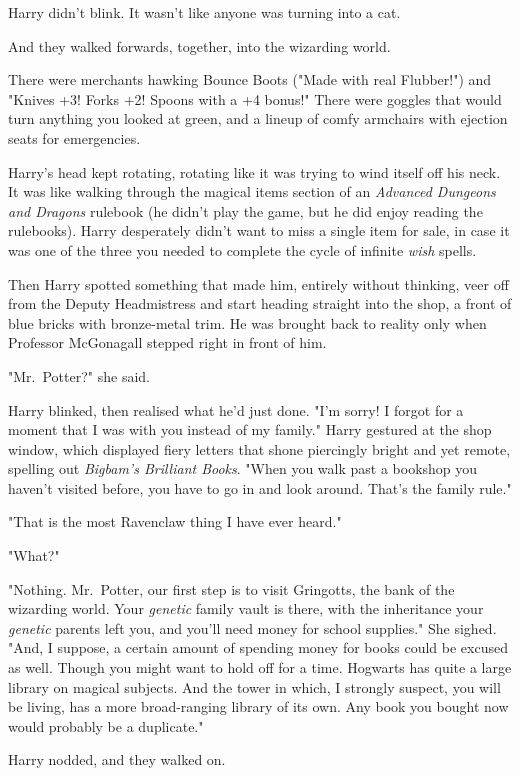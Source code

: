 Harry didn't blink. It wasn't like anyone was turning into a cat.

And they walked forwards, together, into the wizarding world.

There were merchants hawking Bounce Boots ("Made with real Flubber!") and
"Knives +3! Forks +2! Spoons with a +4 bonus!" There were goggles that would
turn anything you looked at green, and a lineup of comfy armchairs with
ejection seats for emergencies.

Harry's head kept rotating, rotating like it was trying to wind itself off his
neck. It was like walking through the magical items section of an
\emph{Advanced Dungeons and Dragons} rulebook (he didn't play the game, but he
did enjoy reading the rulebooks). Harry desperately didn't want to miss a
single item for sale, in case it was one of the three you needed to complete
the cycle of infinite \emph{wish} spells.

Then Harry spotted something that made him, entirely without thinking, veer off
from the Deputy Headmistress and start heading straight into the shop, a front
of blue bricks with bronze-metal trim. He was brought back to reality only when
Professor McGonagall stepped right in front of him.

"Mr.~Potter?" she said.

Harry blinked, then realised what he'd just done. "I'm sorry! I forgot for a
moment that I was with you instead of my family." Harry gestured at the shop
window, which displayed fiery letters that shone piercingly bright and yet
remote, spelling out \emph{Bigbam's Brilliant Books}. "When you walk past a
bookshop you haven't visited before, you have to go in and look around. That's
the family rule."

"That is the most Ravenclaw thing I have ever heard."

"What?"

"Nothing. Mr.~Potter, our first step is to visit Gringotts, the bank of the
wizarding world. Your \emph{genetic} family vault is there, with the
inheritance your \emph{genetic} parents left you, and you'll need money for
school supplies." She sighed. "And, I suppose, a certain amount of spending
money for books could be excused as well. Though you might want to hold off for
a time. Hogwarts has quite a large library on magical subjects. And the tower
in which, I strongly suspect, you will be living, has a more broad-ranging
library of its own. Any book you bought now would probably be a duplicate."

Harry nodded, and they walked on.

